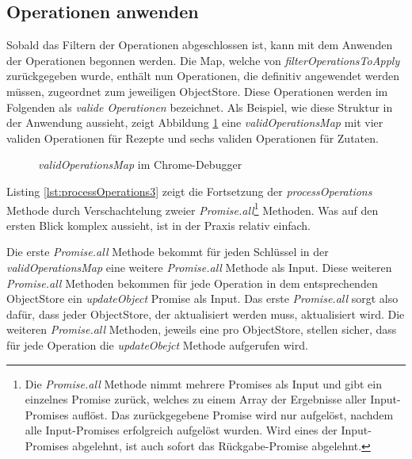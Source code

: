 \documentclass[a4paper, 12pt]{scrreprt}
\begin{document}
\subsection{Operationen anwenden}

Sobald das Filtern der Operationen abgeschlossen ist, kann mit dem Anwenden der Operationen begonnen werden. Die Map, welche von \textit{filterOperationsToApply} zurückgegeben wurde, enthält nun Operationen, die definitiv angewendet werden müssen, zugeordnet zum jeweiligen ObjectStore. Diese Operationen werden im Folgenden als \textit{valide Operationen} bezeichnet. Als Beispiel, wie diese Struktur in der Anwendung aussieht, zeigt Abbildung \ref{fig:validOperationsMapChrome} eine \textit{validOperationsMap} mit vier validen Operationen für Rezepte und sechs validen Operationen für Zutaten.

\begin{figure}[H]
	\centering
	\caption{\textit{validOperationsMap} im Chrome-Debugger}
	\label{fig:validOperationsMapChrome}
\end{figure}

Listing \ref{lst:processOperations3} zeigt die Fortsetzung der \textit{processOperations} Methode durch Verschachtelung zweier \textit{Promise.all}\footnote{Die \textit{Promise.all} Methode nimmt mehrere Promises als Input und gibt ein einzelnes Promise zurück, welches zu einem Array der Ergebnisse aller Input-Promises auflöst. Das zurückgegebene Promise wird nur aufgelöst, nachdem alle Input-Promises erfolgreich aufgelöst wurden. Wird eines der Input-Promises abgelehnt, ist auch sofort das Rückgabe-Promise abgelehnt.} Methoden. Was auf den ersten Blick komplex aussieht, ist in der Praxis relativ einfach.

\begin{minipage}{\linewidth}
	
\end{minipage}

Die erste \textit{Promise.all} Methode bekommt für jeden Schlüssel in der \textit{validOperationsMap} eine weitere \textit{Promise.all} Methode als Input. Diese weiteren \textit{Promise.all} Methoden bekommen für jede Operation in dem entsprechenden ObjectStore ein \textit{updateObject} Promise als Input. Das erste \textit{Promise.all} sorgt also dafür, dass jeder ObjectStore, der aktualisiert werden muss, aktualisiert wird. Die weiteren \textit{Promise.all} Methoden, jeweils eine pro ObjectStore, stellen sicher, dass für jede Operation die \textit{updateObejct} Methode aufgerufen wird.
\end{document}
